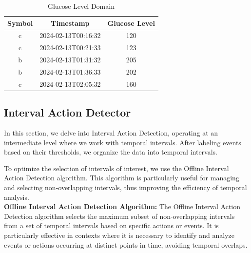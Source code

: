 \documentclass{article}
\begin{document}
\begin{table}[h!]
    \centering
    \begin{tabular}{|c|c|c|}
        \hline
       \textbf{Symbol} & \textbf{Timestamp} & \textbf{Glucose Level} \\
        \hline
        c & 2024-02-13T00:16:32 & 120 \\
        c & 2024-02-13T00:21:33 & 123 \\
        b & 2024-02-13T01:31:32 & 205 \\
        b & 2024-02-13T01:36:33 & 202 \\
        c & 2024-02-13T02:05:32 & 160 \\
        \hline
    \end{tabular}
    \caption{Glucose Level Domain}
    \label{tab:glucose_levels}
\end{table}

\subsection{Interval Action Detector}
In this section, we delve into Interval Action Detection, operating at an intermediate level where we work with temporal intervals. After labeling events based on their thresholds, we organize the data into temporal intervals.

To optimize the selection of intervals of interest, we use the Offline Interval Action Detection algorithm. This algorithm is particularly useful for managing and selecting non-overlapping intervals, thus improving the efficiency of temporal analysis. \\

\textbf{Offline Interval Action Detection Algorithm:}
The Offline Interval Action Detection algorithm selects the maximum subset of non-overlapping intervals from a set of temporal intervals based on specific actions or events. It is particularly effective in contexts where it is necessary to identify and analyze events or actions occurring at distinct points in time, avoiding temporal overlaps.
\end{document}
